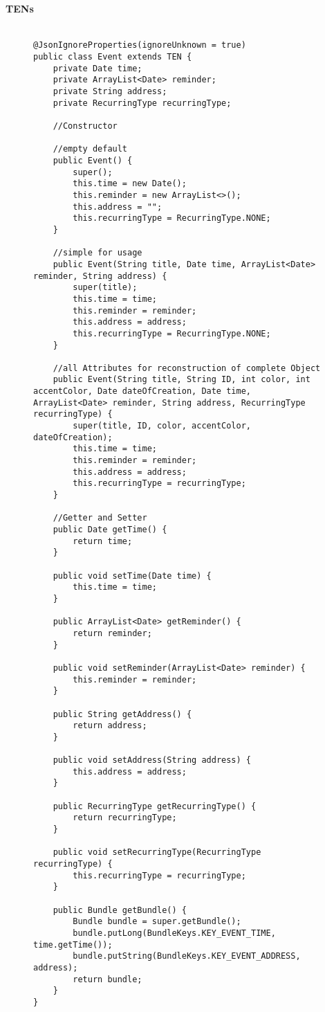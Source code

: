 		\paragraph{TENs}
\begin{figure}[H]
\begin{lstlisting}[caption=Event (Joscha Nassenstein)]

@JsonIgnoreProperties(ignoreUnknown = true)
public class Event extends TEN {
    private Date time;
    private ArrayList<Date> reminder;
    private String address;
    private RecurringType recurringType;

    //Constructor

    //empty default
    public Event() {
        super();
        this.time = new Date();
        this.reminder = new ArrayList<>();
        this.address = "";
        this.recurringType = RecurringType.NONE;
    }

    //simple for usage
    public Event(String title, Date time, ArrayList<Date> reminder, String address) {
        super(title);
        this.time = time;
        this.reminder = reminder;
        this.address = address;
        this.recurringType = RecurringType.NONE;
    }

    //all Attributes for reconstruction of complete Object
    public Event(String title, String ID, int color, int accentColor, Date dateOfCreation, Date time, ArrayList<Date> reminder, String address, RecurringType recurringType) {
        super(title, ID, color, accentColor, dateOfCreation);
        this.time = time;
        this.reminder = reminder;
        this.address = address;
        this.recurringType = recurringType;
    }

    //Getter and Setter
    public Date getTime() {
        return time;
    }

    public void setTime(Date time) {
        this.time = time;
    }

    public ArrayList<Date> getReminder() {
        return reminder;
    }

    public void setReminder(ArrayList<Date> reminder) {
        this.reminder = reminder;
    }

    public String getAddress() {
        return address;
    }

    public void setAddress(String address) {
        this.address = address;
    }

    public RecurringType getRecurringType() {
        return recurringType;
    }

    public void setRecurringType(RecurringType recurringType) {
        this.recurringType = recurringType;
    }

    public Bundle getBundle() {
        Bundle bundle = super.getBundle();
        bundle.putLong(BundleKeys.KEY_EVENT_TIME, time.getTime());
        bundle.putString(BundleKeys.KEY_EVENT_ADDRESS, address);
        return bundle;
    }
}
\end{lstlisting}
\end{figure}

